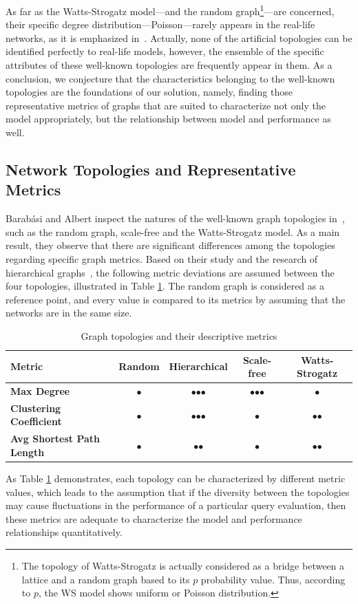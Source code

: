 As far as the Watts-Strogatz model---and the random graph\footnote{The topology of Watts-Strogatz is actually considered as a bridge between a lattice and a random graph based to its $p$ probability value. Thus, according to $p$, the WS model shows uniform or Poisson distribution.}---are concerned, their specific degree distribution---Poisson---rarely appears in the real-life networks, as it is emphasized in~\cite{random_study}. Actually, none of the artificial topologies can be identified perfectly to real-life models, however, the ensemble of the specific attributes of these well-known topologies are frequently appear in them. As a conclusion, we conjecture that the characteristics belonging to the well-known topologies are the foundations of our solution, namely, finding those representative metrics of graphs that are suited to characterize not only the model appropriately, but the relationship between model and performance as well.

\subsection{Network Topologies and Representative Metrics}

Barabási and Albert inspect the natures of the well-known graph topologies in~\cite{statistical_mechanics}, such as the random graph, scale-free and the Watts-Strogatz model. As a main result, they observe that there are significant differences among the topologies regarding specific graph metrics. Based on their study and the research of hierarchical graphs~\cite{hierarchical}, the following metric deviations are assumed	between the four topologies, illustrated in Table \ref{tab:topology_metrics}. The random graph is considered as a reference point, and every value is compared to its metrics by assuming that the networks are in the same size.
\begin{table}[ht]
	\footnotesize
	\centering
	\begin{tabular}{ l c c c c}
		\toprule
		Metric & Random & Hierarchical & Scale-free & Watts-Strogatz \\ 
		\midrule 
		\textbf{Max Degree} & $\bullet$ & $\bullet$$\bullet$$\bullet$ & $\bullet$$\bullet$$\bullet$ & $\bullet$ \\ \hline
		\textbf{Clustering Coefficient} & $\bullet$ & $\bullet$$\bullet$$\bullet$ & $\bullet$ & $\bullet$$\bullet $\\ \hline
		\textbf{Avg Shortest Path Length} & $\bullet$ & $\bullet$$\bullet$ & $\bullet$ & $\bullet$$\bullet$ \\ \hline
		\bottomrule
	\end{tabular}
	\caption{Graph topologies and their descriptive metrics}
	\label{tab:topology_metrics}
\end{table}
As Table \ref{tab:topology_metrics} demonstrates, each topology can be characterized by different metric values, which leads to the assumption that if the diversity between the topologies may cause fluctuations in the performance of a particular query evaluation, then these metrics are adequate to characterize the model and performance relationships quantitatively.

